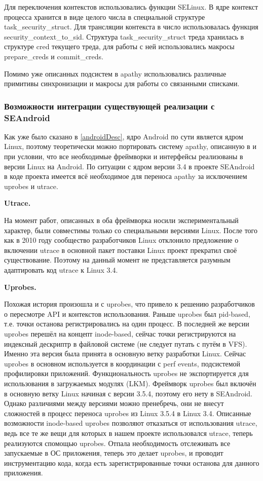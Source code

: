 Для переключения контекстов использовались функции SELinux. В ядре
контекст процесса хранится в виде целого числа в специальной структуре
task\_security\_struct. Для трансляции контекста в число использовалась
функция security\_context\_to\_sid. Структура task\_security\_struct
треда хранилась в структуре cred текущего треда, для работы с ней
использовались макросы prepare\_creds и commit\_creds.

Помимо уже описанных подсистем в apathy использовались различные
примитивы синхронизации и макросы для работы со связанными списками.

\subsubsection{Возможности интеграции существующей реализации с
SEAndroid}

Как уже было сказано в \ref{androidDesc}, ядро Android по сути является
ядром Linux, поэтому теоретически можно портировать систему apathy,
описанную в \cite{sacharov} и \cite{bush} при условии, что все
необходимые фреймворки и интерфейсы реализованы в версии Linux на
Android. По ситуации с ядром версии 3.4 в проекте SEAndroid в коде
проекта имеется всё необходимое для переноса apathy за исключением
uprobes и utrace. 

\bigskip
{\bfseries Utrace.}

\bigskip
На момент работ, описанных в \cite{sacharov} оба фреймворка носили
экспериментальный характер, были совместимы только со специальными
версиями Linux. После того как в 2010 году сообщество разработчиков
Linux отклонило предложение о включении utrace в основной пакет поставки
Linux проект прекратил своё существование. Поэтому на данный момент не
представляется разумным адаптировать код utrace к Linux 3.4. 

\bigskip
{\bfseries Uprobes.}

\bigskip
Похожая история произошла и с uprobes, что привело к решению
разработчиков о пересмотре API и контекстов использования. Раньше
uprobes был pid-based, т.е. точки останова регистрировались на один
процесс. В последней же версии uprobes перешёл на концепт inode-based,
сейчас точки регистрируются на индексный дескриптр в файловой системе
(не следует путать с путём в VFS).  Именно эта версия была принята в
основную ветку разработки Linux. Сейчас uprobes в основном используется
в координации с perf events, подсистемой профилировки приложений.
Функциональность uprobes не экспортируется для использования в
загружаемых модулях (LKM).  Фреймворк uprobes был включён в основную
ветку Linux начиная с версии 3.5.4, поэтому его нету в SEAndroid. Однако
различиями между версиями можно пренебречь, они не внесут сложностей в
процесс переноса uprobes из Linux 3.5.4 в Linux 3.4. Описанные
возможности inode-based uprobes позволяют отказаться от использования
utrace, ведь все те же вещи для которых в нашем проекте использовался
utrace, теперь реализуются спомощью uprobes. Отпала необходимость
отслеживать все запускаемые в ОС приложения, теперь это делает uprobes,
и проводит инструментацию кода, когда есть зарегистрированные точки
останова для данного приложения.

